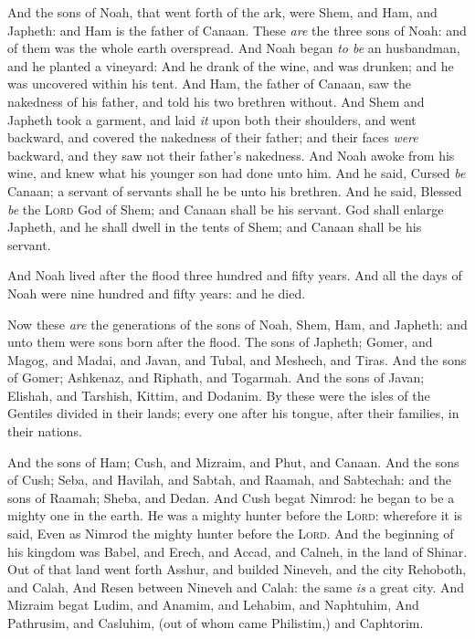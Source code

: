\documentclass[11pt,letterpaper,oneside]{memoir}
\begin{document}
And the sons of Noah, that went forth of the ark, were Shem, and Ham,
and Japheth: and Ham is the father of Canaan. These \emph{are} the three
sons of Noah: and of them was the whole earth overspread. And Noah began
\emph{to be} an husbandman, and he planted a vineyard: And he drank of
the wine, and was drunken; and he was uncovered within his tent. And
Ham, the father of Canaan, saw the nakedness of his father, and told his
two brethren without. And Shem and Japheth took a garment, and laid
\emph{it} upon both their shoulders, and went backward, and covered the
nakedness of their father; and their faces \emph{were} backward, and
they saw not their father's nakedness. And Noah awoke from his wine, and
knew what his younger son had done unto him. And he said, Cursed
\emph{be} Canaan; a servant of servants shall he be unto his brethren.
And he said, Blessed \emph{be} the \textsc{Lord} God of Shem; and Canaan
shall be his servant. God shall enlarge Japheth, and he shall dwell in
the tents of Shem; and Canaan shall be his servant.

And Noah lived after the flood three hundred and fifty years. And all
the days of Noah were nine hundred and fifty years: and he died.

Now these \emph{are} the generations of the sons of Noah, Shem, Ham, and
Japheth: and unto them were sons born after the flood. The sons of
Japheth; Gomer, and Magog, and Madai, and Javan, and Tubal, and Meshech,
and Tiras. And the sons of Gomer; Ashkenaz, and Riphath, and Togarmah.
And the sons of Javan; Elishah, and Tarshish, Kittim, and Dodanim. By
these were the isles of the Gentiles divided in their lands; every one
after his tongue, after their families, in their nations.

And the sons of Ham; Cush, and Mizraim, and Phut, and Canaan. And the
sons of Cush; Seba, and Havilah, and Sabtah, and Raamah, and Sabtechah:
and the sons of Raamah; Sheba, and Dedan. And Cush begat Nimrod: he
began to be a mighty one in the earth. He was a mighty hunter before the
\textsc{Lord}: wherefore it is said, Even as Nimrod the mighty hunter
before the \textsc{Lord}. And the beginning of his kingdom was Babel, and
Erech, and Accad, and Calneh, in the land of Shinar. Out of that land
went forth Asshur, and builded Nineveh, and the city Rehoboth, and
Calah, And Resen between Nineveh and Calah: the same \emph{is} a great
city. And Mizraim begat Ludim, and Anamim, and Lehabim, and Naphtuhim,
And Pathrusim, and Casluhim, (out of whom came Philistim,) and
Caphtorim.
\end{document}
